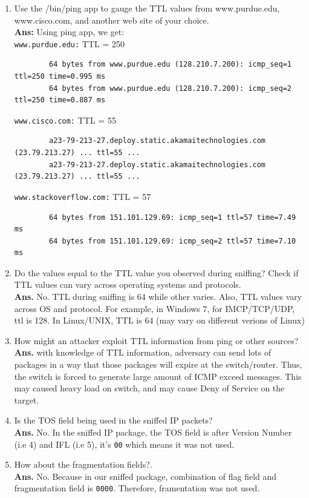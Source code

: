 \documentclass[12pt]{article}
\newenvironment{problem}[2][Problem]{\begin{trivlist}
\item[\hskip \labelsep {\bfseries #1}\hskip \labelsep {\bfseries #2.}]}{\end{trivlist}}
\begin{document}
\begin{problem}{3}
\begin{enumerate}
		\item Use the /bin/ping app to gauge the TTL values from www.purdue.edu, www.cisco.com, and another web site of your choice. 
		\\\textbf{Ans:} Using ping app, we get: \\
		\texttt{www.purdue.edu:} TTL = 250 
		\begin{verbatim}
		64 bytes from www.purdue.edu (128.210.7.200): icmp_seq=1 ttl=250 time=0.995 ms
		64 bytes from www.purdue.edu (128.210.7.200): icmp_seq=2 ttl=250 time=0.887 ms	
		\end{verbatim}
		\texttt{www.cisco.com:} TTL = 55 
		\begin{verbatim}
		a23-79-213-27.deploy.static.akamaitechnologies.com (23.79.213.27) ... ttl=55 ...
		a23-79-213-27.deploy.static.akamaitechnologies.com (23.79.213.27) ... ttl=55 ...
		\end{verbatim}
		\texttt{www.stackoverflow.com:} TTL = 57 
		\begin{verbatim}
		64 bytes from 151.101.129.69: icmp_seq=1 ttl=57 time=7.49 ms
		64 bytes from 151.101.129.69: icmp_seq=2 ttl=57 time=7.10 ms
		\end{verbatim}
		\item Do the values equal to the TTL value you observed during sniffing? 
		Check if TTL values can vary across operating systems and protocols. 
		\\ \textbf{Ans.} No. TTL during sniffing is 64 while other varies. Also, TTL values vary across OS and protocol. For example, in Windows 7, for IMCP/TCP/UDP, ttl is 128. In Linux/UNIX, TTL is 64 (may vary on different verions of Linux) 
		\item How might an attacker exploit TTL information from ping or other sources? 
		\\\textbf{Ans.} with knowledge of TTL information, adversary can send lots of packages in a way that those packages will expire at the switch/router. Thus, the switch is forced to generate large amount of ICMP exceed messages. This may caused heavy load on switch, and may cause Deny of Service on the target. 
		\item Is the TOS field being used in the sniffed IP packets?
		\\ \textbf{Ans.} No. In the sniffed IP package, the TOS field is after Version Number (i.e 4) and IFL (i.e 5), it's \texttt{00} which means it was not used.
 		\item How about the fragmentation fields?.
 		\\\textbf{Ans. }No. Because in our sniffed package, combination of flag field and fragmentation field  is \texttt{0000}. Therefore, framentation was not used.
	\end{enumerate}



\end{problem}
\end{document}
